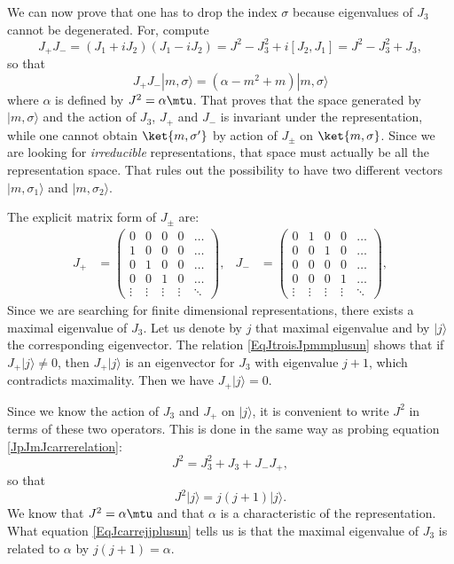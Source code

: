 We can now prove that one has to drop the index $\sigma$ because eigenvalues of $J_3$ cannot be degenerated. For, compute
\begin{equation}        \label{JpJmJcarrerelation}
    J_+J_-=(J_1+iJ_2)(J_1-iJ_2)=J^2-J_3^2+i[J_2,J_1]=J^2-J_3^2+J_3,
\end{equation}
so that
\[
    J_+J_-| m,\sigma \rangle =(\alpha-m^2+m)| m,\sigma \rangle
\]
where $\alpha$ is defined by $J^2=\alpha\mtu$. That proves that the space generated by $| m,\sigma \rangle $ and the action of $J_3$, $J_+$ and $J_-$ is invariant under the representation, while one cannot obtain $\ket{m,\sigma'}$ by action of $J_{\pm}$ on $\ket{m,\sigma}$. Since we are looking for \emph{irreducible} representations, that space must actually be all the representation space. That rules out the possibility to have two different vectors $| m,\sigma_1 \rangle $ and $| m,\sigma_2 \rangle $.

The explicit matrix form of $J_{\pm}$ are:
\begin{align}
J_{+}&=
\begin{pmatrix}
0   &   0   &   0   &0  &\hdots\\
1   &   0   &   0   &0  &\hdots\\
0   &   1   &   0   &0  &\hdots\\
0   &   0   &   1   &0  &\hdots\\
\vdots  &   \vdots  &   \vdots  &\vdots &\ddots
\end{pmatrix},
&J_{-}&=
\begin{pmatrix}
0   &   1   &   0   &0  &\hdots\\
0   &   0   &   1   &0  &\hdots\\
0   &   0   &   0   &0  &\hdots\\
0   &   0   &   0   &1  &\hdots\\
\vdots  &   \vdots  &   \vdots  &\vdots &\ddots
\end{pmatrix},
\end{align}
Since we are searching for finite dimensional representations, there exists a maximal eigenvalue of $J_3$. Let us denote by $j$ that maximal eigenvalue and by $| j \rangle$ the corresponding eigenvector. The relation \eqref{EqJtroisJpmmplusun} shows that if $J_+| j \rangle\neq 0$, then $J_+| j \rangle$ is an eigenvector for $J_3$ with eigenvalue $j+1$, which contradicts maximality. Then we have $J_+| j \rangle=0$.

Since we know the action of $J_3$ and $J_+$ on $| j \rangle$, it is convenient to write $J^2$ in terms of these two operators. This is done in the same way as probing equation \eqref{JpJmJcarrerelation}:
\begin{equation}
    J^2=J_3^2+J_3+J_-J_+,
\end{equation}
so that
\begin{equation}        \label{EqJcarrejjplusun}
    J^2| j \rangle=j(j+1)| j \rangle.
\end{equation}
We know that $J^2=\alpha\mtu$ and that $\alpha$ is a characteristic of the representation. What equation \eqref{EqJcarrejjplusun} tells us is that the maximal eigenvalue of $J_3$ is related to $\alpha$ by $j(j+1)=\alpha$.

